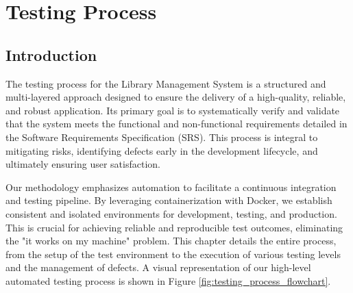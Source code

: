 \chapter{Testing Process}
\label{cha:testing_process}

\section{Introduction}
\label{sec:testing_process_intro}
The testing process for the Library Management System is a structured and multi-layered approach designed to ensure the delivery of a high-quality, reliable, and robust application. Its primary goal is to systematically verify and validate that the system meets the functional and non-functional requirements detailed in the Software Requirements Specification (SRS). This process is integral to mitigating risks, identifying defects early in the development lifecycle, and ultimately ensuring user satisfaction.

Our methodology emphasizes automation to facilitate a continuous integration and testing pipeline. By leveraging containerization with Docker, we establish consistent and isolated environments for development, testing, and production. This is crucial for achieving reliable and reproducible test outcomes, eliminating the "it works on my machine" problem. This chapter details the entire process, from the setup of the test environment to the execution of various testing levels and the management of defects. A visual representation of our high-level automated testing process is shown in Figure \ref{fig:testing_process_flowchart}.

